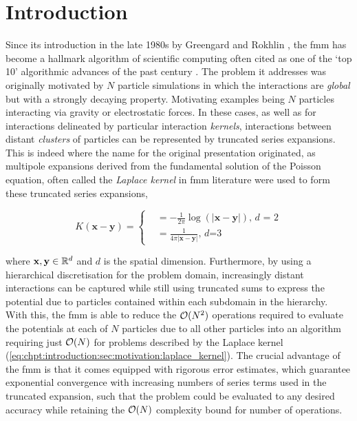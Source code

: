 
\chapter{Introduction}\label{chpt:introduction}
\thispagestyle{chaptertitle} %
Since its introduction in the late 1980s by Greengard and Rokhlin \cite{greengard1987fast}, the \acrfull{fmm} has become a hallmark algorithm of scientific computing often cited as one of the `top 10' algorithmic advances of the past century \cite{cipra2000best}. The problem it addresses was originally motivated by $N$ particle simulations in which the interactions are \textit{global} but with a strongly decaying property. Motivating examples being $N$ particles interacting via gravity or electrostatic forces. In these cases, as well as for interactions delineated by particular interaction \textit{kernels}, interactions between distant \textit{clusters} of particles can be represented by truncated series expansions. This is indeed where the name for the original presentation originated, as multipole expansions derived from the fundamental solution of the Poisson equation, often called the \textit{Laplace kernel} in \acrshort{fmm} literature were used to form these truncated series expansions,


\begin{equation}
    K(\mathbf{x-y}) =  \begin{cases}
        &= -\frac{1}{2\pi} \log(|\mathbf{x-y}|) \text{, $d$ = 2} \\
        &= \frac{1}{4\pi | \mathbf{x-y}|} \text{, $d$=3 }
    \end{cases}
    \label{eq:chpt:introduction:laplace_kernel}
\end{equation}


where $\mathbf{x}, \mathbf{y} \in \mathbb{R}^d$ and $d$ is the spatial dimension. Furthermore, by using a hierarchical discretisation for the problem domain, increasingly distant interactions can be captured while still using truncated sums to express the potential due to particles contained within each subdomain in the hierarchy. With this, the \acrshort{fmm} is able to reduce the $\mathcal{O}(N^2)$ operations required to evaluate the potentials at each of $N$ particles due to all other particles into an algorithm requiring just $\mathcal{O}(N)$ for problems described by the Laplace kernel (\ref{eq:chpt:introduction:sec:motivation:laplace_kernel}). The crucial advantage of the \acrshort{fmm} is that it comes equipped with rigorous error estimates, which guarantee exponential convergence with increasing numbers of series terms used in the truncated expansion, such that the problem could be evaluated to any desired accuracy while retaining the $\mathcal{O}(N)$ complexity bound for number of operations.

